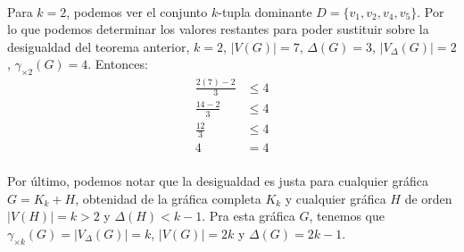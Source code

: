 \documentclass{article}
\begin{document}
\begin{center}
\\
\end{center}


Para $k=2$, podemos ver el conjunto $k$-tupla dominante $D=\{v_1, v_2, v_4, v_5\}$. Por lo que podemos determinar los valores restantes para poder sustituir sobre la desigualdad del teorema anterior, $k=2$, $|V(G)|=7$, $\Delta(G)=3$, $|V_\Delta(G)|=2$, $\gamma_{\times 2}(G)=4$. Entonces:\\

\begin{align*}
\frac{2(7)- 2}{3}&\leq 4\\
\frac{14- 2}{3}&\leq 4\\
\frac{12}{3}&\leq 4\\
4 & = 4\\
\end{align*}


Por último, podemos notar que la desigualdad es justa para cualquier gráfica $G=K_k + H$, obtenidad de la gráfica completa $K_k$ y cualquier gráfica $H$ de orden $|V(H)|=k>2$ y $\Delta(H)<k-1$. Pra esta gráfica $G$, tenemos que $\gamma_{\times k}(G)=|V_\Delta(G)|=k$, $|V(G)|=2k$ y $\Delta(G)=2k-1$.


\newpage
\end{document}

